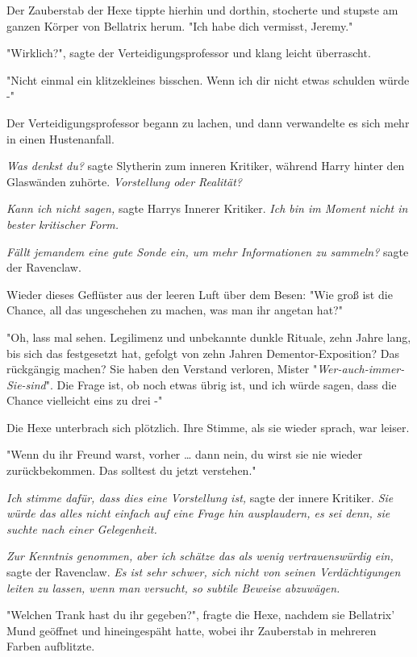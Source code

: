 {Der Zauberstab der Hexe tippte hierhin und dorthin, stocherte und stupste am ganzen Körper von Bellatrix herum. "Ich habe dich vermisst, Jeremy."

"Wirklich?", sagte der Verteidigungsprofessor und klang leicht überrascht.

"Nicht einmal ein klitzekleines bisschen. Wenn ich dir nicht etwas schulden würde -"

Der Verteidigungsprofessor begann zu lachen, und dann verwandelte es sich mehr in einen Hustenanfall.

\emph{Was denkst du?} sagte Slytherin zum inneren Kritiker, während Harry hinter den Glaswänden zuhörte. \emph{Vorstellung oder Realität?}

\emph{Kann ich nicht sagen,} sagte Harrys Innerer Kritiker. \emph{Ich bin im Moment nicht in bester kritischer Form.}

\emph{Fällt jemandem eine gute Sonde ein, um mehr Informationen zu sammeln?} sagte der Ravenclaw.

Wieder dieses Geflüster aus der leeren Luft über dem Besen: "Wie groß ist die Chance, all das ungeschehen zu machen, was man ihr angetan hat?"

"Oh, lass mal sehen. Legilimenz und unbekannte dunkle Rituale, zehn Jahre lang, bis sich das festgesetzt hat, gefolgt von zehn Jahren Dementor-Exposition? Das rückgängig machen? Sie haben den Verstand verloren, Mister "\emph{Wer-auch-immer-Sie-sind}". Die Frage ist, ob noch etwas übrig ist, und ich würde sagen, dass die Chance vielleicht eins zu drei -"

Die Hexe unterbrach sich plötzlich. Ihre Stimme, als sie wieder sprach, war leiser.

"Wenn du ihr Freund warst, vorher … dann nein, du wirst sie nie wieder zurückbekommen. Das solltest du jetzt verstehen."

\emph{Ich stimme dafür, dass dies eine Vorstellung ist,} sagte der innere Kritiker. \emph{Sie würde das alles nicht einfach auf eine Frage hin ausplaudern, es sei denn, sie suchte nach einer Gelegenheit.}

\emph{Zur Kenntnis genommen, aber ich schätze das als wenig vertrauenswürdig ein,} sagte der Ravenclaw. \emph{Es ist sehr schwer, sich nicht von seinen Verdächtigungen leiten zu lassen, wenn man versucht, so subtile Beweise abzuwägen.}

"Welchen Trank hast du ihr gegeben?", fragte die Hexe, nachdem sie Bellatrix' Mund geöffnet und hineingespäht hatte, wobei ihr Zauberstab in mehreren Farben aufblitzte.

}
